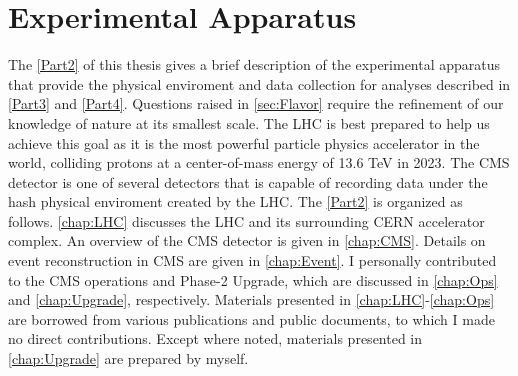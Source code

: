\part{Experimental Apparatus}
\label{Part2}
The \autoref{Part2} of this thesis gives a brief description of the experimental apparatus that provide the physical enviroment and data collection for analyses described in \autoref{Part3} and \autoref{Part4}. Questions raised in \autoref{sec:Flavor} require the refinement of our knowledge of nature at its smallest scale. The \ac{LHC} is best prepared to help us achieve this goal as it is the most powerful particle physics accelerator in the world, colliding protons at a center-of-mass energy of 13.6 TeV in 2023. The \ac{CMS} detector is one of several detectors that is capable of recording data under the hash physical enviroment created by the \ac{LHC}. The \autoref{Part2} is organized as follows. \autoref{chap:LHC} discusses the \ac{LHC} and its surrounding \ac{CERN} accelerator complex. An overview of the \ac{CMS} detector is given in \autoref{chap:CMS}. Details on event reconstruction in \ac{CMS} are given in \autoref{chap:Event}. I personally contributed to the \ac{CMS} operations and Phase-2 Upgrade, which are discussed in \autoref{chap:Ops} and \autoref{chap:Upgrade}, respectively. Materials presented in \autoref{chap:LHC}-\autoref{chap:Ops} are borrowed from various publications and public documents, to which I made no direct contributions. Except where noted, materials presented in \autoref{chap:Upgrade} are prepared by myself.






